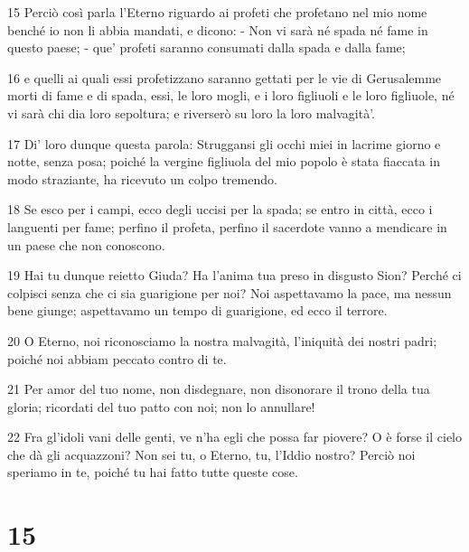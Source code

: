 \par 15 Perciò così parla l'Eterno riguardo ai profeti che profetano nel mio nome benché io non li abbia mandati, e dicono: - Non vi sarà né spada né fame in questo paese; - que' profeti saranno consumati dalla spada e dalla fame;
\par 16 e quelli ai quali essi profetizzano saranno gettati per le vie di Gerusalemme morti di fame e di spada, essi, le loro mogli, e i loro figliuoli e le loro figliuole, né vi sarà chi dia loro sepoltura; e riverserò su loro la loro malvagità'.
\par 17 Di' loro dunque questa parola: Struggansi gli occhi miei in lacrime giorno e notte, senza posa; poiché la vergine figliuola del mio popolo è stata fiaccata in modo straziante, ha ricevuto un colpo tremendo.
\par 18 Se esco per i campi, ecco degli uccisi per la spada; se entro in città, ecco i languenti per fame; perfino il profeta, perfino il sacerdote vanno a mendicare in un paese che non conoscono.
\par 19 Hai tu dunque reietto Giuda? Ha l'anima tua preso in disgusto Sion? Perché ci colpisci senza che ci sia guarigione per noi? Noi aspettavamo la pace, ma nessun bene giunge; aspettavamo un tempo di guarigione, ed ecco il terrore.
\par 20 O Eterno, noi riconosciamo la nostra malvagità, l'iniquità dei nostri padri; poiché noi abbiam peccato contro di te.
\par 21 Per amor del tuo nome, non disdegnare, non disonorare il trono della tua gloria; ricordati del tuo patto con noi; non lo annullare!
\par 22 Fra gl'idoli vani delle genti, ve n'ha egli che possa far piovere? O è forse il cielo che dà gli acquazzoni? Non sei tu, o Eterno, tu, l'Iddio nostro? Perciò noi speriamo in te, poiché tu hai fatto tutte queste cose.

\chapter{15}


